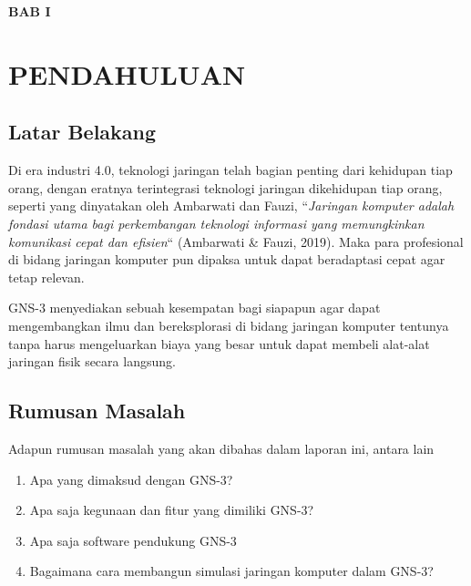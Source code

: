 \documentclass[12pt, a4paper]{article}
\begin{document}
  \begin{center}
  \tableofcontents
  \end{center}

  \newpage
  

  \begin{center}
    \large{\textbf{BAB I}}

    \section*{PENDAHULUAN}
  \end{center}

  \vspace{1cm}

    \subsection{Latar Belakang}

  Di era industri 4.0, teknologi jaringan telah bagian penting dari
  kehidupan tiap orang, dengan eratnya terintegrasi teknologi
  jaringan dikehidupan tiap orang, seperti yang dinyatakan
  oleh Ambarwati dan Fauzi, ``\emph{Jaringan komputer adalah
  fondasi utama bagi perkembangan teknologi informasi yang memungkinkan komunikasi
  cepat dan efisien}`` (Ambarwati \& Fauzi, 2019). Maka para profesional
  di bidang jaringan komputer pun dipaksa untuk dapat beradaptasi cepat
  agar tetap relevan.

  GNS-3 menyediakan sebuah kesempatan bagi siapapun agar dapat
  mengembangkan ilmu dan bereksplorasi di bidang jaringan komputer tentunya
  tanpa harus mengeluarkan biaya yang besar untuk dapat membeli alat-alat
  jaringan fisik secara langsung.

    \subsection{Rumusan Masalah}

      Adapun rumusan masalah yang akan dibahas dalam laporan ini, antara lain

      \begin{enumerate}[label=\arabic*.]
        \item Apa yang dimaksud dengan GNS-3?
        \item Apa saja kegunaan dan fitur yang dimiliki GNS-3?
        \item Apa saja software pendukung GNS-3
        \item Bagaimana cara membangun simulasi jaringan komputer dalam GNS-3?
      \end{enumerate}
\end{document}

